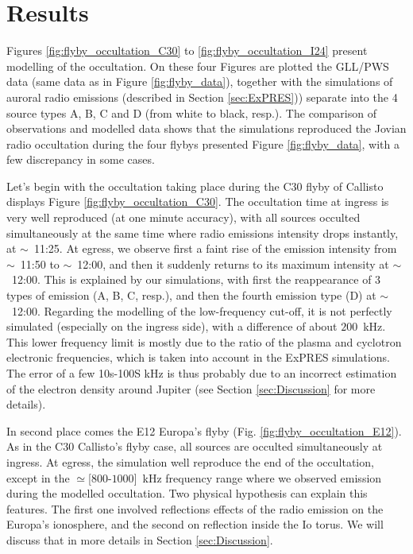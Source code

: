 \documentclass[referee]{aa}
\begin{document}
\section{Results} %
Figures \ref{fig:flyby_occultation_C30} to \ref{fig:flyby_occultation_I24} present modelling of the occultation. On these four Figures are plotted the GLL/PWS data (same data as in Figure \ref{fig:flyby_data}), together with the simulations of auroral radio emissions (described in Section \ref{sec:ExPRES})) separate into the 4 source types A, B, C and D (from white to black, resp.). The comparison of observations and modelled data shows that the simulations reproduced the Jovian radio occultation during the four flybys presented Figure \ref{fig:flyby_data}, with a few discrepancy in some cases. 

Let's begin with the occultation taking place during the C30 flyby of Callisto displays Figure \ref{fig:flyby_occultation_C30}. The occultation time at ingress is very well reproduced (at one minute accuracy), with all sources occulted simultaneously at the same time where radio emissions intensity drops instantly, at $\sim$~11:25. At egress, we observe first a faint rise of the emission intensity from $\sim$~11:50 to $\sim$~12:00, and then it suddenly returns to its maximum intensity at $\sim$~12:00. This is explained by our simulations, with first the reappearance of 3 types of emission (A, B, C, resp.), and then the fourth emission type (D) at $\sim$~12:00. Regarding the modelling of the low-frequency cut-off, it is not perfectly simulated (especially on the ingress side), with a difference of about $200$~kHz. This lower frequency limit is mostly due to the ratio of the plasma and cyclotron electronic frequencies, which is taken into account in the ExPRES simulations. The error of a few 10s-100S kHz is thus probably due to an incorrect estimation of the electron density around Jupiter (see Section \ref{sec:Discussion} for more details).


In second place comes the E12 Europa's flyby (Fig. \ref{fig:flyby_occultation_E12}). As in the C30 Callisto's flyby case, all sources are occulted simultaneously at ingress. At egress, the simulation well reproduce the end of the occultation, except in the $\simeq$[$800$-$1000$]~kHz frequency range where we observed emission during the modelled occultation. Two physical hypothesis can explain this features. The first one involved reflections effects of the radio emission on the Europa's ionosphere, and the second on reflection inside the Io torus. We will discuss that in more details in Section \ref{sec:Discussion}.
\end{document}
